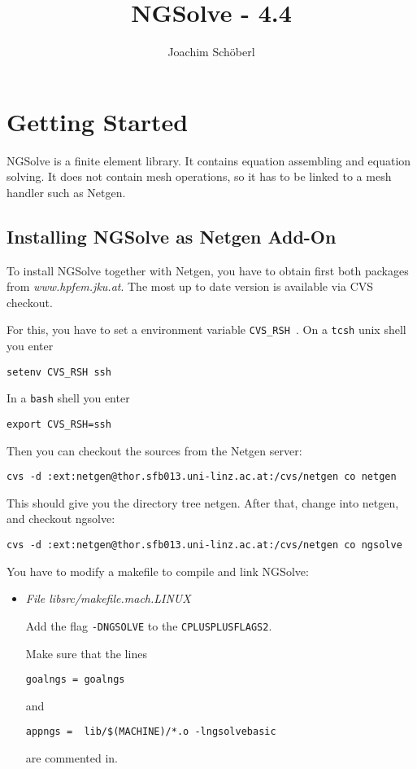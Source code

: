 \documentclass[12pt]{book}
\title{NGSolve - 4.4}
\author{Joachim Sch\"oberl}
\begin{document}
\maketitle
\tableofcontents

\chapter{Getting Started}

NGSolve is a finite element library. It contains equation assembling
and equation solving.  It does not contain mesh operations, so it has
to be linked to a mesh handler such as Netgen.

\section{Installing NGSolve as Netgen Add-On}

To install NGSolve together with Netgen, you have to obtain first
both packages from {\em www.hpfem.jku.at}. 
The most up to date version is available via CVS checkout.

For this, you have to set a environment variable {\tt CVS\_RSH }. 
On a {\tt tcsh} unix shell you enter
\begin{verbatim}
setenv CVS_RSH ssh
\end{verbatim}
In a {\tt bash} shell you enter
\begin{verbatim}
export CVS_RSH=ssh
\end{verbatim}

Then you can checkout the sources from the Netgen server:
\begin{verbatim}
cvs -d :ext:netgen@thor.sfb013.uni-linz.ac.at:/cvs/netgen co netgen
\end{verbatim}

This should give you the directory tree netgen. After that, change
into netgen, and checkout ngsolve:

\begin{verbatim}
cvs -d :ext:netgen@thor.sfb013.uni-linz.ac.at:/cvs/netgen co ngsolve
\end{verbatim}


You have to modify a makefile to compile and link NGSolve:

\begin{itemize}
\item
{\em File libsrc/makefile.mach.LINUX}

Add the flag {\tt -DNGSOLVE} to the {\tt CPLUSPLUSFLAGS2}.

Make sure that the lines \\
\begin{verbatim}
goalngs = goalngs
\end{verbatim}
and
\begin{verbatim}
appngs =  lib/$(MACHINE)/*.o -lngsolvebasic
\end{verbatim}
are commented in.
\end{itemize}
\end{document}
